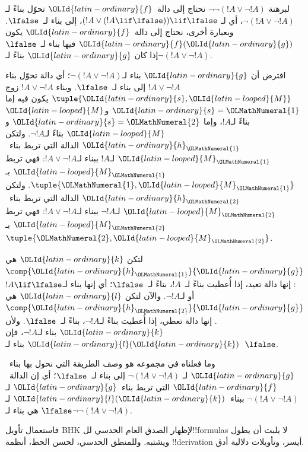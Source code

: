\documentclass[../../../include/open-logic-section]{subfiles}
\begin{document}
\begin{ex}
لبرهنة $\lnot \lnot (!A \lor \lnot !A)$ نحتاج إلى دالة~$\OLId{latin-ordinary}{f}$ تحوّل
بناءً لـ$\lnot(!A \lor \lnot !A)$، أي لـ
$(!A \lor (!A \lif \lfalse)) \lif \lfalse$، إلى بناء لـ~$\lfalse$.
وبعبارة أخرى، نحتاج إلى دالة~$\OLId{latin-ordinary}{f}$ يكون $\OLId{latin-ordinary}{f}(\OLId{latin-ordinary}{g})$ فيها بناء لـ~$\lfalse$
إذا كان $\OLId{latin-ordinary}{g}$ بناءً لـ$\lnot(!A \lor \lnot !A)$.

افترض أن $\OLId{latin-ordinary}{g}$ بناء لـ$\lnot(!A \lor \lnot !A)$؛ أي دالة تحوّل بناء
$!A \lor \lnot !A$ إلى بناء لـ~$\lfalse$. وبناء
$!A \lor \lnot !A$ زوج $\tuple{\OLId{latin-ordinary}{s}, \OLId{latin-looped}{M}}$ يكون فيه إما $\OLId{latin-ordinary}{s} = \OLMathNumeral{1}$ و$\OLId{latin-looped}{M}$
بناءً لـ$!A$، وإما $\OLId{latin-ordinary}{s} = \OLMathNumeral{2}$ و$\OLId{latin-looped}{M}$ بناءً لـ$\lnot !A$. ولتكن $\OLId{latin-ordinary}{h}_\OLMathNumeral{1}$
الدالة التي تربط بناء~$\OLId{latin-looped}{M}_\OLMathNumeral{1}$ لـ$!A$ ببناء لـ$!A \lor \lnot !A$:
فهي تربط $\OLId{latin-looped}{M}_\OLMathNumeral{1}$ بـ$\tuple{\OLMathNumeral{1}, \OLId{latin-looped}{M}_\OLMathNumeral{1}}$. ولتكن $\OLId{latin-ordinary}{h}_\OLMathNumeral{2}$ الدالة التي تربط
بناء~$\OLId{latin-looped}{M}_\OLMathNumeral{2}$ لـ$\lnot !A$ ببناء لـ$!A \lor \lnot !A$: فهي تربط
$\OLId{latin-looped}{M}_\OLMathNumeral{2}$ بـ$\tuple{\OLMathNumeral{2}, \OLId{latin-looped}{M}_\OLMathNumeral{2}}$.

لتكن $\OLId{latin-ordinary}{k}$ هي $\comp{\OLId{latin-ordinary}{h}_\OLMathNumeral{1}}{\OLId{latin-ordinary}{g}}$: إنها دالة تعيد، إذا أُعطيت بناءً لـ~$!A$،
بناءً لـ~$\lfalse$؛ أي إنها بناء لـ$!A \lif \lfalse$ أو لـ$\lnot !A$.
والآن لتكن $\OLId{latin-ordinary}{l}$ هي $\comp{\OLId{latin-ordinary}{h}_\OLMathNumeral{2}}{\OLId{latin-ordinary}{g}}$. إنها دالة تعطي، إذا أُعطيت بناءً
لـ$\lnot !A$، بناءً لـ~$\lfalse$. ولأن $\OLId{latin-ordinary}{k}$ بناء لـ$\lnot !A$، فإن
$\OLId{latin-ordinary}{l}(\OLId{latin-ordinary}{k})$ بناء لـ~$\lfalse$.

وما فعلناه في مجموعه هو وصف الطريقة التي نحول بها بناء~$\OLId{latin-ordinary}{g}$ لـ
$\lnot(!A \lor \lnot !A)$ إلى بناء لـ~$\lfalse$؛ أي إن الدالة~$\OLId{latin-ordinary}{f}$
التي تربط بناء~$\OLId{latin-ordinary}{g}$ لـ$\lnot(!A \lor \lnot !A)$ ببناء~$\OLId{latin-ordinary}{l}(\OLId{latin-ordinary}{k})$ لـ
$\lfalse$ هي بناء لـ$\lnot\lnot(!A \lor \lnot !A)$.
\end{ex}

فاستعمال تأويل BHK لإظهار الصدق العام الحدسي لل!!{formula}s لا يلبث أن
يطول ويشتبه. وللمنطق الحدسي، لحسن الحظ، أنظمة !!{derivation} أيسر،
وتأويلات دلالية أدق.
\end{document}
